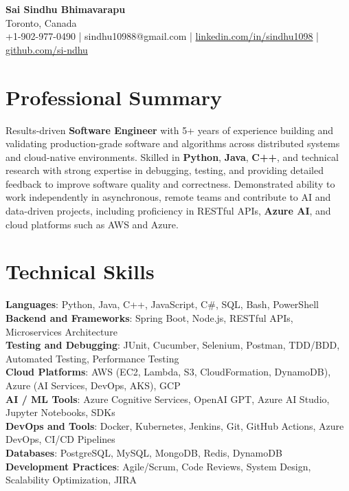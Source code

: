 \documentclass[letterpaper,11pt]{article}
\begin{document}
\begin{center}
  {\Large \textbf{Sai Sindhu Bhimavarapu}} \\
  Toronto, Canada \\
  +1-902-977-0490 \enspace | \enspace sindhu10988@gmail.com \enspace | \enspace \href{https://www.linkedin.com/in/sindhu1098/}{linkedin.com/in/sindhu1098} \enspace | \enspace \href{https://github.com/si-ndhu}{github.com/si-ndhu}
\end{center}

\section{Professional Summary}
  \begin{itemize}[leftmargin=0.15in, label={}]
    \small{\item{
     Results-driven \textbf{Software Engineer} with 5+ years of experience building and validating production-grade software and algorithms across distributed systems and cloud-native environments. Skilled in \textbf{Python}, \textbf{Java}, \textbf{C++}, and technical research with strong expertise in debugging, testing, and providing detailed feedback to improve software quality and correctness. Demonstrated ability to work independently in asynchronous, remote teams and contribute to AI and data-driven projects, including proficiency in RESTful APIs, \textbf{Azure AI}, and cloud platforms such as AWS and Azure.
    }}
  \end{itemize}
\vspace{-16pt}

\section{Technical Skills}
 \begin{itemize}[leftmargin=0.15in, label={}]
    \small{\item{
     \textbf{Languages}: Python, Java, C++, JavaScript, C\#, SQL, Bash, PowerShell \\
     \textbf{Backend and Frameworks}: Spring Boot, Node.js, RESTful APIs, Microservices Architecture \\
     \textbf{Testing and Debugging}: JUnit, Cucumber, Selenium, Postman, TDD/BDD, Automated Testing, Performance Testing \\
     \textbf{Cloud Platforms}: AWS (EC2, Lambda, S3, CloudFormation, DynamoDB), Azure (AI Services, DevOps, AKS), GCP \\
     \textbf{AI / ML Tools}: Azure Cognitive Services, OpenAI GPT, Azure AI Studio, Jupyter Notebooks, SDKs \\
     \textbf{DevOps and Tools}: Docker, Kubernetes, Jenkins, Git, GitHub Actions, Azure DevOps, CI/CD Pipelines \\
     \textbf{Databases}: PostgreSQL, MySQL, MongoDB, Redis, DynamoDB \\
     \textbf{Development Practices}: Agile/Scrum, Code Reviews, System Design, Scalability Optimization, JIRA
    }}
 \end{itemize}
\vspace{-16pt}
\end{document}
